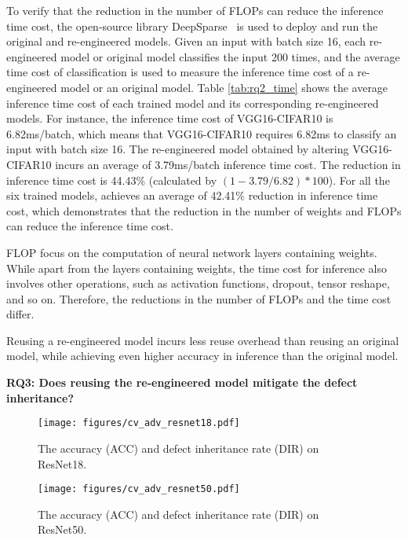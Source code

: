 To verify that the reduction in the number of FLOPs can reduce the inference time cost, the open-source library DeepSparse~\cite{deepsparse} is used to deploy and run the original and re-engineered models. 
Given an input with batch size 16, each re-engineered model or original model classifies the input 200 times, and the average time cost of classification is used to measure the inference time cost of a re-engineered model or an original model.
Table \ref{tab:rq2_time} shows the average inference time cost of each trained model and its corresponding re-engineered models. 
For instance, the inference time cost of VGG16-CIFAR10 is 6.82ms/batch, which means that VGG16-CIFAR10 requires 6.82ms to classify an input with batch size 16. The re-engineered model obtained by altering VGG16-CIFAR10 incurs an average of 3.79ms/batch inference time cost. The reduction in inference time cost is 44.43\% (calculated by $(1-3.79/6.82)*100$).
For all the six trained models, \projectName achieves an average of 42.41\% reduction in inference time cost, which demonstrates that the reduction in the number of weights and FLOPs can reduce the inference time cost.

FLOP focus on the computation of neural network layers containing weights.
While apart from the layers containing weights, the time cost for inference also involves other operations, such as activation functions, dropout, tensor reshape, and so on.  
Therefore, the reductions in the number of FLOPs and the time cost differ. %

\begin{tcolorbox}[left=2pt,right=2pt,top=2pt,bottom=2pt]
Reusing a re-engineered model incurs less reuse overhead than reusing an original model, while achieving even higher accuracy in inference than the original model.
\end{tcolorbox}

\noindent \textbf{RQ3: Does reusing the re-engineered model mitigate the defect inheritance?}


\begin{figure}
    \centering
    \texttt{[image: figures/cv\_adv\_resnet18.pdf]}
    \caption{The accuracy (ACC) and defect inheritance rate (DIR) on ResNet18.}%
    \label{fig:adv_resnet18}
\end{figure}

\begin{figure}
    \centering
    \texttt{[image: figures/cv\_adv\_resnet50.pdf]}
    \caption{The accuracy (ACC) and defect inheritance rate (DIR) on ResNet50.}
    \label{fig:adv_resnet50}
\end{figure}

